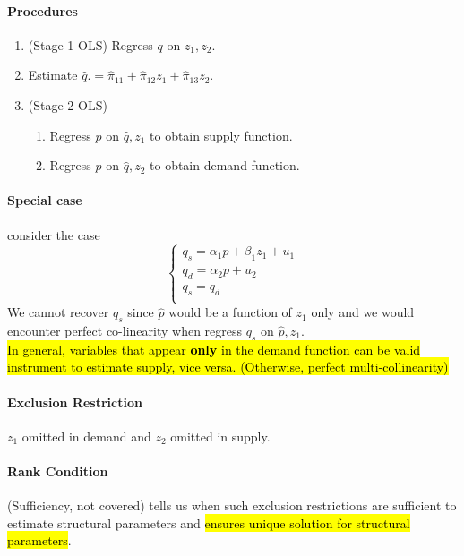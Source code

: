 \documentclass[]{article}
\begin{document}
			\paragraph{Procedures}
			\begin{enumerate}
				\item (Stage 1 OLS) Regress $q$ on $z_1, z_2$.
				\item Estimate $\hat{q}.= \hat{\pi}_{11} + \hat{\pi}_{12} z_1 + \hat{\pi}_{13} z_2$.
				\item (Stage 2 OLS)
				\begin{enumerate}
					\item Regress $p$ on $\hat{q}, z_1$ to obtain supply function.
					\item Regress $p$ on $\hat{q}, z_2$ to obtain demand function.
				\end{enumerate}
			\end{enumerate}
			
			\paragraph{Special case} consider the case
			\begin{equation}
				\begin{cases}
					q_s = \alpha_1 p + \beta_1 z_1 + u_1 \\
					q_d = \alpha_2 p + u_2 \\
					q_s = q_d \\
				\end{cases}
			\end{equation}
			We cannot recover $q_s$ since $\hat{p}$ would be a function of $z_1$ only and we would encounter perfect co-linearity when regress $q_s$ on $\hat{p}, z_1$. \\
			\hl{In general, variables that appear \textbf{only} in the demand function can be valid instrument to estimate supply, vice versa. (Otherwise, perfect multi-collinearity)}
			\paragraph{Exclusion Restriction} $z_1$ omitted in demand and $z_2$ omitted in supply.
			\paragraph{Rank Condition}(Sufficiency, not covered) tells us when such exclusion restrictions are sufficient to estimate structural parameters and \hl{ensures unique solution for structural parameters}.
\end{document}

